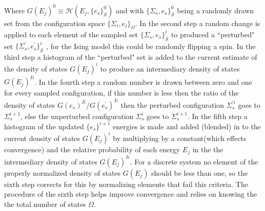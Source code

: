 \documentclass[twocolumn]{article}
\begin{document}
Where  $G(E_j)^0 \equiv \mathcal{H}(E_j,\{e_s\}_{\mathcal{S}}^0)$ and with $\{\Sigma_{s},e_s\}_{\mathcal{S}}^0$  being a randomly drawn set from the configuration space $\{ \Sigma_i, e_i \}_\Omega $. In the second step  a random change is applied to each element of the sampled set $\{\Sigma_{s},e_s\}_{\mathcal{S}}^i$ to produced a ``perturbed" set $ \{\Sigma_{s}^{'},e_s^{'}\}_{\mathcal{S}}^i$ , for the Ising model this could be randomly flipping a spin. In the third step a histogram of the ``perturbed" set is added to the current estimate of the density of states $G(E_j)^i$ to produce an intermediary density of states $G(E_j)^{Ii}$. In the fourth step a random number is drawn between zero and one for every sampled configuration, if this number is less then the ratio of the density of states $G(e_s)^{Ii}/G(e_s^{'})^{Ii}$ then the perturbed configuration $\Sigma_{s}^{'i}$ goes to $\Sigma_{s}^{i+1}$,  else the unperturbed configuration $\Sigma_{s}^{i}$ goes to $\Sigma_{s}^{i+1}$. In the fifth step a histogram of the updated $\{ e_s \}^{i+1}$ energies is made and added (blended) in to the current density of states $G(E_j)^i$   by multiplying  by a constant(which effects convergence) and the relative probability of each energy $E_j$ in the the intermediary density of states $G(E_j)^{Ii}$.  For a discrete system no element of the properly normalized density of states $G(E_j)$ should  be less than one, so the sixth step corrects for this by normalizing elements that fail this criteria. The procedure of the sixth step helps improve convergence and relies on knowing the the total number of states $\Omega$. 
\end{document}

